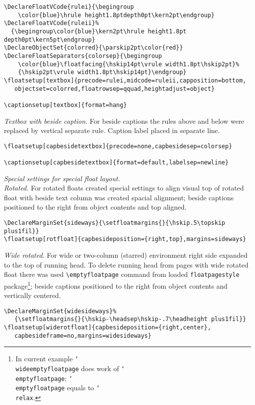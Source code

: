 \documentclass[twocolumn]{book}
\let\emptyfloatpage\relax
\providecommand*{\pkg}[1]{\texttt{#1}}
\providecommand*{\com}[1]{\texttt{\char`\\#1}}
\begin{document}
\begin{sl}
\begin{verbatim}
\DeclareFloatVCode{rulei}{\begingroup
    \color{blue}\hrule height1.8ptdepth0pt\kern2pt\endgroup}
\DeclareFloatVCode{ruleii}%
  {\begingroup\color{blue}\kern2pt\hrule height1.8pt depth0pt\kern5pt\endgroup}
\DeclareObjectSet{colorred}{\parskip2pt\color{red}}
\DeclareFloatSeparators{colorsep}{\begingroup
    \color{blue}\floatfacing{\hskip14pt\vrule width1.8pt\hskip2pt}%
    {\hskip2pt\vrule width1.8pt\hskip14pt}\endgroup}
\floatsetup[textbox]{precode=rulei,midcode=ruleii,capposition=bottom,
   objectset=colorred,floatrowsep=qquad,heightadjust=object}

\captionsetup[textbox]{format=hang}
\end{verbatim}
\emph{Textbox with beside caption.}
For beside captions the rules above and below were replaced by vertical
separate rule. Caption label placed in separate line.
\begin{verbatim}
\floatsetup[capbesidetextbox]{precode=none,capbesidesep=colorsep}

\captionsetup[capbesidetextbox]{format=default,labelsep=newline}
\end{verbatim}

\emph{Special settings for special float layout.}\\
\emph{Rotated.}
For rotated floats created special settings to align visual top of rotated
float with beside text column was created spacial alignment; beside captions
positioned to the right from object contents and top aligned.
\begin{verbatim}
\DeclareMarginSet{sideways}{\setfloatmargins{}{\hskip.5\topskip plus1fil}}
\floatsetup[rotfloat]{capbesideposition={right,top},margins=sideways}
\end{verbatim}
\emph{Wide rotated.}
For wide or two-column (starred)
environment right side expanded to the top of running head. To delete running
head from pages with wide rotated float there was used \verb|\emptyfloatpage|
command from loaded \pkg{floatpagestyle} package\footnote{In current example
\protect\com{wideemptyfloatpage} does work of \protect\com{emptyfloatpage};
\protect\com{emptyfloatpage} equals to \protect\com{relax}.}; beside captions
positioned to the right from object contents and vertically centered.
\begin{verbatim}
\DeclareMarginSet{widesideways}%
   {\setfloatmargins{}{\hskip-\headsep\hskip-.7\headheight plus1fil}}
\floatsetup[widerotfloat]{capbesideposition={right,center},
   capbesideframe=no,margins=widesideways}
\end{verbatim}

\end{sl}

\endgroup

\twocolumn


\end{document}
